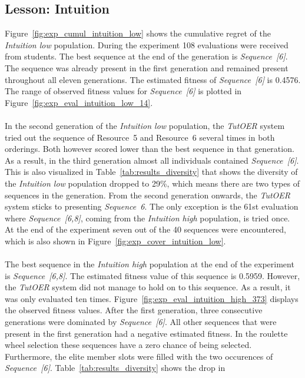 \subsection{Lesson: Intuition}
\label{sec:results_intuition}
Figure~\ref{fig:exp_cumul_intuition_low} shows the cumulative regret of the
\emph{Intuition low} population. During the experiment 108 evaluations were
received from students. The best sequence at the end of the generation is
\emph{Sequence~[6]}. The sequence was already present in the first generation
and remained present throughout all eleven generations. The estimated fitness of
\emph{Sequence~[6]} is 0.4576. The range of observed fitness values for
\emph{Sequence~[6]} is plotted in Figure~\ref{fig:exp_eval_intuition_low_14}.
\\\\
\noindent
In the second generation of the \emph{Intuition low} population, the
\emph{TutOER} system tried out the sequence of Resource~5 and Resource~6
several times in both orderings. Both however scored lower than the best
sequence in that generation. As a result, in the third generation almost all
individuals contained \emph{Sequence~[6]}. This is also visualized in
Table~\ref{tab:results_diversity} that shows the diversity of the
\emph{Intuition low} population dropped to 29\%, which means there are two
types of sequences in the generation. From the second generation onwards, the
\emph{TutOER} system sticks to presenting \emph{Sequence~6}. The only exception
is the 61st evaluation where \emph{Sequence~[6,8]}, coming from the
\emph{Intuition high} population, is tried once. At the end of the experiment
seven out of the 40 sequences were encountered, which is also shown in
Figure~\ref{fig:exp_cover_intuition_low}.\\\\
\noindent
The best sequence in the \emph{Intuition high}
population at the end of the experiment is \emph{Sequence~[6,8]}. The estimated
fitness value of this sequence is 0.5959. However, the \emph{TutOER} system did
not manage to hold on to this sequence. As a result, it was only evaluated ten
times. Figure~\ref{fig:exp_eval_intuition_high_373} displays the observed
fitness values. After the first generation, three consecutive generations were
dominated by \emph{Sequence~[6]}. All other sequences that were present in the
first generation had a negative estimated fitness. In the roulette wheel
selection these sequences have a zero chance of being selected. Furthermore,
the elite member slots were filled with the two occurences of
\emph{Sequence~[6]}. Table~\ref{tab:results_diversity} shows the drop in

